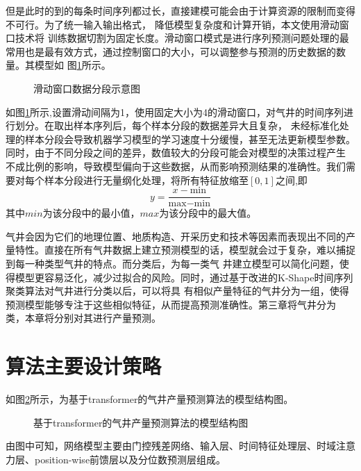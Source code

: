但是此时的到的每条时间序列都过长，直接建模可能会由于计算资源的限制而变得不可行。为了统一输入输出格式，
降低模型复杂度和计算开销，本文使用滑动窗口技术将
训练数据切割为固定长度。滑动窗口模式是进行序列预测问题处理的最常用也是最有效方式，通过控制窗口的大小，可以调整参与预测的历史数据的数量。其模型如
图\ref{fig:slidewindow}所示。
\begin{figure}[H]
    \label{fig:slidewindow}
    \caption{滑动窗口数据分段示意图}
\end{figure}
如图\ref{fig:slidewindow}所示,设置滑动间隔为1，使用固定大小为4的滑动窗口，对气井的时间序列进行划分。在取出样本序列后，每个样本分段的数据差异大且复杂，
未经标准化处理的样本分段会导致机器学习模型的学习速度十分缓慢，甚至无法更新模型参数。同时，由于不同分段之间的差异，数值较大的分段可能会对模型的决策过程产生
不成比例的影响，导致模型偏向于这些数据，从而影响预测结果的准确性。我们需要对每个样本分段进行无量纲化处理，将所有特征放缩至$[0,1]$之间,即
\begin{equation}
    y = \frac{x - \text{min}}{\text{max} - \text{min}}
\end{equation}
其中$min$为该分段中的最小值，$max$为该分段中的最大值。

气井会因为它们的地理位置、地质构造、开采历史和技术等因素而表现出不同的产量特性。直接在所有气井数据上建立预测模型的话，模型就会过于复杂，难以捕捉到每一种类型气井的特点。而分类后，为每一类气
井建立模型可以简化问题，使得模型更容易泛化，减少过拟合的风险。同时，通过基于改进的K-Shape时间序列聚类算法对气井进行分类以后，可以将具
有相似产量特征的气井分为一组，使得预测模型能够专注于这些相似特征，从而提高预测准确性。第三章将气井分为 类，本章将分别对其进行产量预测。
\section{算法主要设计策略}
如图\ref{fig:TFT}所示，为基于transformer的气井产量预测算法的模型结构图。
\begin{figure}
    \label{fig:TFT}
    \caption{基于transformer的气井产量预测算法的模型结构图}
\end{figure}
由图中可知，网络模型主要由门控残差网络、输入层、时间特征处理层、时域注意力层、position-wise前馈层以及分位数预测层组成。
